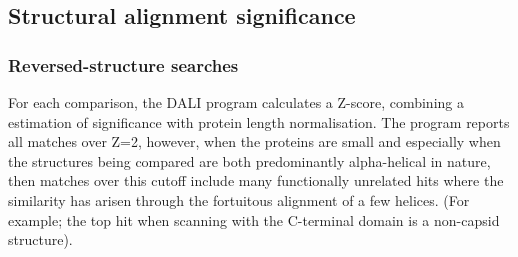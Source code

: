 % 
% 

\subsection{Structural alignment significance}

\subsubsection{Reversed-structure searches}

For each comparison, the DALI program calculates a Z-score, combining a estimation of significance
with protein length normalisation.   The program reports all matches over Z=2, however, when the
proteins are small and especially when the structures being compared are both predominantly
alpha-helical in nature, then matches over this cutoff include many functionally unrelated
hits where the similarity has arisen through the fortuitous alignment of a few helices.
(For example; the top hit when scanning with the C-terminal domain is a non-capsid structure).

